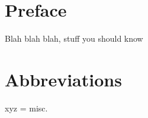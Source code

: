 \cleardoublepage

\chapter*{Preface}\label{preface}


Blah blah blah, stuff you should know

\cleardoublepage

\chapter*{Abbreviations}\label{abbreviations}


xyz = misc.

